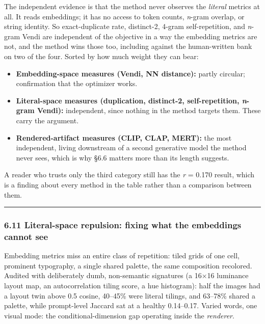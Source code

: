 \documentclass[
  11pt,
]{article}
\providecommand{\tightlist}{%
  \setlength{\itemsep}{0pt}\setlength{\parskip}{0pt}}
\theoremstyle{plain}
\theoremstyle{definition}
\providecommand{\tightlist}{%
  \setlength{\itemsep}{0pt}\setlength{\parskip}{0pt}}
\begin{document}
The independent evidence is that the method never observes the
\emph{literal} metrics at all. It reads embeddings; it has no access to
token counts, \emph{n}-gram overlap, or string identity. So
exact-duplicate rate, distinct-2, 4-gram self-repetition, and
\emph{n}-gram Vendi are independent of the objective in a way the
embedding metrics are not, and the method wins those too, including
against the human-written bank on two of the four. Sorted by how much
weight they can bear:

\begin{itemize}
\tightlist
\item
  \textbf{Embedding-space measures (Vendi, NN distance):} partly
  circular; confirmation that the optimizer works.
\item
  \textbf{Literal-space measures (duplication, distinct-2,
  self-repetition, \emph{n}-gram Vendi):} independent, since nothing in
  the method targets them. These carry the argument.
\item
  \textbf{Rendered-artifact measures (CLIP, CLAP, MERT):} the most
  independent, living downstream of a second generative model the method
  never sees, which is why §6.6 matters more than its length suggests.
\end{itemize}

A reader who trusts only the third category still has the \emph{r} =
0.170 result, which is a finding about every method in the table rather
than a comparison between them.

\begin{center}\rule{0.5\linewidth}{0.5pt}\end{center}

\subsubsection{6.11 Literal-space repulsion: fixing what the embeddings
cannot
see}\label{611-literal-space-repulsion-fixing-what-the-embeddings-cannot-see}

Embedding metrics miss an entire class of repetition: tiled grids of one
cell, prominent typography, a single shared palette, the same
composition recolored. Audited with deliberately dumb, non-semantic
signatures (a 16×16 luminance layout map, an autocorrelation tiling
score, a hue histogram): half the images had a layout twin above 0.5
cosine, 40--45\% were literal tilings, and 63--78\% shared a palette,
while prompt-level Jaccard sat at a healthy 0.14--0.17. Varied words,
one visual mode: the conditional-dimension gap operating inside the
\emph{renderer}.
\end{document}
